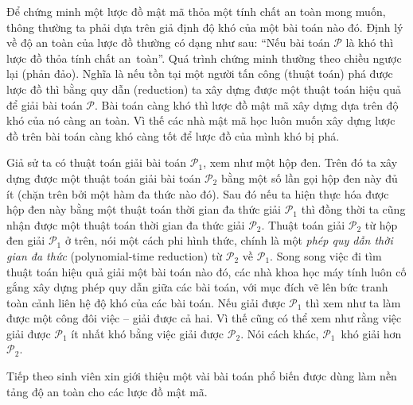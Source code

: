 \documentclass[class=report, crop=false]{standalone}
\begin{document}
		Để chứng minh một lược đồ mật mã thỏa một tính chất an toàn mong muốn, thông thường ta phải dựa trên giả định độ khó của một bài toán nào đó. Định lý về độ an toàn của lược đồ thường có dạng như sau: ``Nếu bài toán $\mathcal{P}$ là khó thì lược đồ thỏa tính chất an~toàn''. Quá trình chứng minh thường theo chiều ngược lại (phản đảo). Nghĩa là nếu tồn tại một người tấn công (thuật toán) phá được lược đồ thì bằng quy dẫn (reduction) ta xây dựng được một thuật toán hiệu quả để giải bài toán $\mathcal{P}$. Bài toán càng khó thì lược đồ mật mã xây dựng dựa trên độ khó của nó càng an toàn. Vì thế các nhà mật mã học luôn muốn xây dựng lược đồ trên bài toán càng khó càng tốt để lược đồ của mình khó bị phá.
		
		Giả sử ta có thuật toán giải bài toán $\mathcal{P}_1$, xem như một hộp đen. Trên đó ta xây dựng được một thuật toán giải bài toán $\mathcal{P}_2$ bằng một số lần gọi hộp đen này đủ ít (chặn trên bởi một hàm đa thức nào đó). Sau đó nếu ta hiện thực hóa được hộp đen này bằng một thuật toán thời gian đa thức giải $\mathcal{P}_1$ thì đồng thời ta cũng nhận được một thuật toán thời gian đa thức giải $\mathcal{P}_2$. Thuật toán giải $\mathcal{P}_2$ từ hộp đen giải $\mathcal{P}_1$ ở trên, nói một cách phi hình thức, chính là một \textit{phép quy dẫn thời gian đa thức} (polynomial-time reduction) từ $\mathcal{P}_2$ về $\mathcal{P}_1$. Song song việc đi tìm thuật toán hiệu quả giải một bài toán nào đó, các nhà khoa học máy tính luôn cố gắng xây dựng phép quy dẫn giữa các bài toán, với mục đích vẽ lên bức tranh toàn cảnh liên hệ độ khó của các bài toán. Nếu giải được $\mathcal{P}_1$ thì xem như ta làm được một công đôi việc -- giải được cả hai. Vì thế cũng có thể xem như rằng việc giải được $\mathcal{P}_1$ ít nhất khó bằng việc giải được $\mathcal{P}_2$. Nói cách khác, $\mathcal{P}_1$~khó giải hơn $\mathcal{P}_2$.

		Tiếp theo sinh viên xin giới thiệu một vài bài toán phổ biến được dùng làm nền tảng độ an toàn cho các lược đồ mật mã.
\end{document}
